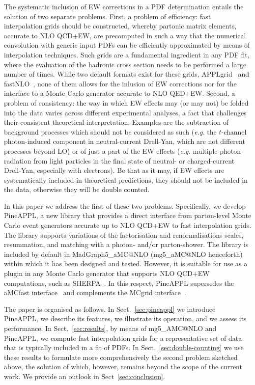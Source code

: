 The systematic inclusion of EW corrections in a PDF determination entails
the solution of two separate problems. First, a problem of efficiency:
fast interpolation grids should be constructed, whereby partonic matrix 
elements, accurate to NLO QCD+EW, are precomputed in such a way that the 
numerical convolution with generic input PDFs can be efficiently approximated
by means of interpolation techniques. Such grids are a fundamental ingredient
in any PDF fit, where the evaluation of the hadronic cross section needs to 
be performed a large number of times. While two default formats exist for
these grids, {\sc APPLgrid}~\cite{Carli:2010rw} and 
{\sc fastNLO}~\cite{Kluge:2006xs}, none of them allows for the inlusion of EW
corrections nor for the interface to a Monte Carlo generator accurate to 
NLO QED+EW. Second, a problem of consistency: the way in which EW effects may
(or may not) be folded into the data varies across different experimental 
analyses, a fact that challenges their consistent theoretical interpretation. 
Examples are the subtraction of background processes which should not be 
considered as such ({\it e.g.} the $t$-channel photon-induced component in 
neutral-current Drell-Yan, which are not different processes beyond LO) or of 
just a part of the EW effects ({\it e.g.} multiple-photon radiation from light 
particles in the final state of neutral- or charged-current Drell-Yan, 
especially with electrons). Be that as it may, if EW effects are systematically
included in theoretical predictions, they should not be included in the data,
otherwise they will be double counted.

In this paper we address the first of these two problems. Specifically, 
we develop {\sc PineAPPL}, a new library that provides a direct interface 
from parton-level Monte Carlo event generators accurate up to NLO QCD+EW to
fast interpolation grids. The library supports variations of the factorisation
and renormalisations scales, resummation, and matching with a photon- and/or
parton-shower. The library is included by default in 
{\sc MadGraph5\_aMC@NLO} ({\sc mg5\_aMC@NLO} henceforth) within which it has 
been designed and tested. However, it is suitable for use as a plugin in any 
Monte Carlo generator that supports NLO QCD+EW computations, such as 
{\sc SHERPA}~\cite{Biedermann:2017yoi}. In this respect, {\sc PineAPPL}
supersedes the {\sc aMCfast} interface~\cite{Bertone:2014zva} and complements
the {\sc MCgrid} interface~\cite{DelDebbio:2013kxa,Bothmann:2015dba}.

The paper is organised as follows. In Sect.~\ref{sec:pineappl} we introduce
{\sc PineAPPL}, we describe its features, we illustrate its operation, and we
assess its performance. In Sect.~\ref{sec:results}, by means of 
{\sc mg5\_AMC@NLO} and {\sc PineAPPL}, we compute fast interpolation grids for 
a representative set of data that is typically included in a fit of PDFs.
In Sect.~\ref{sec:double-counting} we use these results to formulate more 
comprehensively the second problem sketched above, the solution of which, 
however, remains beyond the scope of the current work. We provide an outlook in
Sect~\ref{sec:conclusion}.

